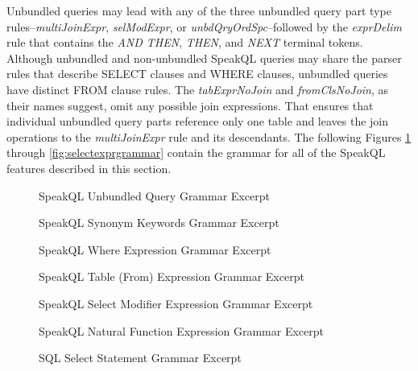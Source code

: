 Unbundled queries may lead with any of the three unbundled query part type rules--\emph{multiJoinExpr}, \emph{selModExpr}, or \emph{unbdQryOrdSpc}--followed by the \emph{exprDelim} rule that contains the \emph{AND THEN}, \emph{THEN}, and \emph{NEXT} terminal tokens. 
Although unbundled and non-unbundled SpeakQL queries may share the parser rules that describe SELECT clauses and WHERE clauses, unbundled queries have distinct FROM clause rules. 
The \emph{tabExprNoJoin} and \emph{fromClsNoJoin}, as their names suggest, omit any possible join expressions. That ensures that individual unbundled query parts reference only one table and leaves the join operations to the \emph{multiJoinExpr} rule and its descendants.
The following Figures \ref{fig:unbundlegrammar} through \ref{fig:selectexprgrammar} contain the grammar for all of the SpeakQL features described in this section.

\begin{figure}[H]
  \unbundleQueryTable
  \caption{SpeakQL Unbundled Query Grammar Excerpt}
  \label{fig:unbundlegrammar}
\end{figure}

\begin{figure}[H]
\synonymgrammartable
\caption{SpeakQL Synonym Keywords Grammar Excerpt}
\label{fig:synonymgrammar}
\end{figure}

\begin{figure}[H]
\whereExpressionTable
\caption{SpeakQL Where Expression Grammar Excerpt}
\label{fig:wheregrammar}
\end{figure}

\begin{figure}[H]
\tableExpressionTable
\caption{SpeakQL Table (From) Expression Grammar Excerpt}
\label{fig:tablegrammar}
\end{figure}

\begin{figure}[H]
\selectModifierTable
\caption{SpeakQL Select Modifier Expression Grammar Excerpt}
\label{fig:modifiergrammar}
\end{figure}

\begin{figure}[H]
\naturalFunctionTable
\caption{SpeakQL Natural Function Expression Grammar Excerpt}
\label{fig:naturalfunctiongrammar}
\end{figure}

\begin{figure}[H]
\sqlSelectStatementTable
\caption{SQL Select Statement Grammar Excerpt}
\label{fig:sqlselectgrammar}
\end{figure}

